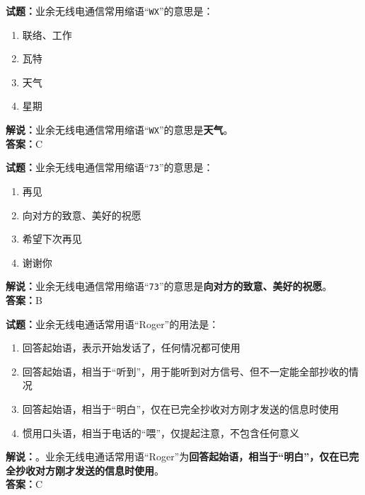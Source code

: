 \documentclass{ctexbook}
\begin{document}
\vspace{\baselineskip}

\noindent\textbf{试题：}业余无线电通信常用缩语“\texttt{WX}”的意思是：

\begin{enumerate}[leftmargin=3em]
  \item 联络、工作
  \item 瓦特
  \item 天气
  \item 星期
\end{enumerate}

\noindent\textbf{解说：}业余无线电通信常用缩语“\texttt{WX}”的意思是\textbf{天气}。\\\noindent\textbf{答案：}C

\vspace{\baselineskip}

\noindent\textbf{试题：}业余无线电通信常用缩语“\texttt{73}”的意思是：

\begin{enumerate}[leftmargin=3em]
  \item 再见
  \item 向对方的致意、美好的祝愿
  \item 希望下次再见
  \item 谢谢你
\end{enumerate}

\noindent\textbf{解说：}业余无线电通信常用缩语“\texttt{73}”的意思是\textbf{向对方的致意、美好的祝愿}。\\\noindent\textbf{答案：}B

\vspace{\baselineskip}

\noindent\textbf{试题：}业余无线电通话常用语“Roger”的用法是：

\begin{enumerate}[leftmargin=3em]
  \item 回答起始语，表示开始发话了，任何情况都可使用
  \item 回答起始语，相当于“听到”，用于能听到对方信号、但不一定能全部抄收的情况
  \item 回答起始语，相当于“明白”，仅在已完全抄收对方刚才发送的信息时使用
  \item 惯用口头语，相当于电话的“喂”，仅提起注意，不包含任何意义
\end{enumerate}

\noindent\textbf{解说：}。业余无线电通话常用语“Roger”为\textbf{回答起始语，相当于“明白”，仅在已完全抄收对方刚才发送的信息时使用}。\\\noindent\textbf{答案：}C
\end{document}
